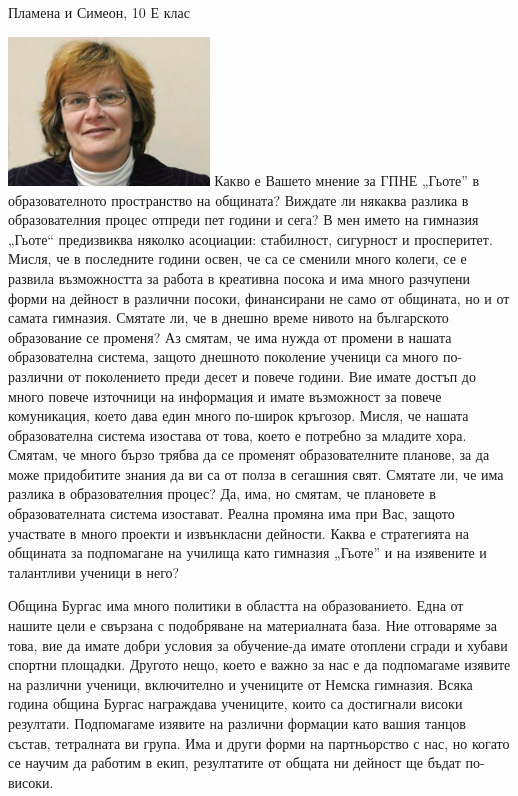 \begin{multicols}{3}
{Пламена и Симеон, 10 Е клас}

\noindent \includegraphics[width=2.1in]{./Ananieva/5.jpg}
Какво е Вашето мнение за ГПНЕ „Гьоте” в образователното пространство на 
общината? Виждате ли някаква разлика в образователния процес отпреди пет години 
и сега?
В мен името на гимназия „Гьоте“ предизвиква няколко асоциации: стабилност, 
сигурност и просперитет. Мисля, че в последните години освен, че са се сменили 
много колеги, се е развила възможността за работа в креативна посока и има много 
разчупени форми на дейност в различни посоки, финансирани не само от общината, 
но и от самата гимназия.
Смятате ли, че в днешно време нивото на българското образование се променя?
Аз смятам, че има нужда от  промени в нашата образователна система, защото 
днешното поколение ученици са много по-различни от поколението преди десет и 
повече години. Вие имате достъп до много повече източници на информация и имате 
възможност за повече комуникация, което дава един много по-широк кръгозор. 
Мисля, че нашата образователна система изостава от това, което е потребно за 
младите хора. Смятам, че много бързо трябва да се променят образователните 
планове, за да може придобитите знания да ви са от полза в сегашния свят.
Смятате ли, че има разлика в образователния процес?
Да, има, но смятам, че плановете в образователната система изостават. Реална 
промяна има при Вас, защото участвате в много проекти и извънкласни дейности.
Каква е стратегията на общината за подпомагане на училища като гимназия „Гьоте” 
и на изявените и талантливи ученици в него?

Община Бургас има много политики в областта на образованието. Една от нашите 
цели е свързана с подобряване на материалната база. Ние отговаряме за това, вие 
да имате добри условия за обучение-да имате отоплени сгради и хубави спортни 
площадки. Другото нещо, което е важно за нас е да подпомагаме изявите на 
различни ученици, включително и учениците от Немска гимназия. Всяка година 
община Бургас награждава учениците, които са достигнали високи резултати. 
Подпомагаме изявите на различни формации като вашия танцов състав, тетралната ви 
група. Има и други форми на партньорство с нас, но когато се научим да работим в 
екип, резултатите от общата ни дейност ще бъдат по-високи.


\end{multicols}
